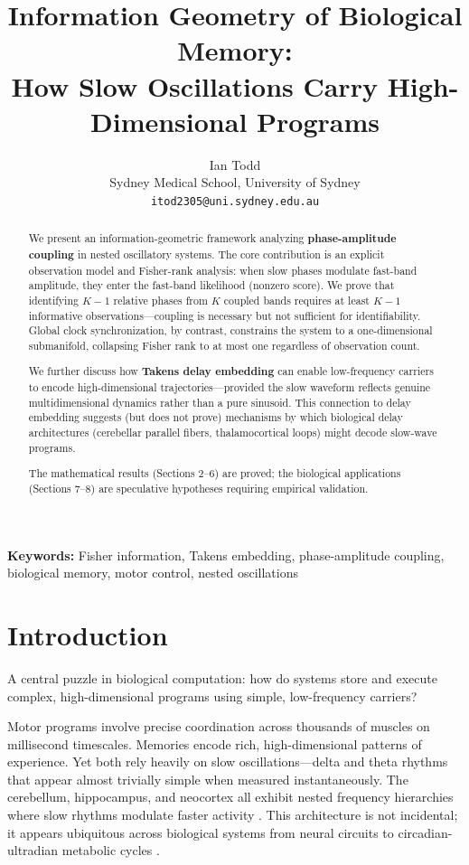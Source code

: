 \documentclass[12pt]{article}
\title{Information Geometry of Biological Memory: \\
How Slow Oscillations Carry High-Dimensional Programs}
\author{Ian Todd\\
Sydney Medical School, University of Sydney\\
\texttt{itod2305@uni.sydney.edu.au}}
\date{}
\begin{document}
\maketitle

\begin{abstract}
We present an information-geometric framework analyzing \textbf{phase-amplitude coupling} in nested oscillatory systems. The core contribution is an explicit observation model and Fisher-rank analysis: when slow phases modulate fast-band amplitude, they enter the fast-band likelihood (nonzero score). We prove that identifying $K-1$ relative phases from $K$ coupled bands requires at least $K-1$ informative observations---coupling is necessary but not sufficient for identifiability. Global clock synchronization, by contrast, constrains the system to a one-dimensional submanifold, collapsing Fisher rank to at most one regardless of observation count.

We further discuss how \textbf{Takens delay embedding} can enable low-frequency carriers to encode high-dimensional trajectories---provided the slow waveform reflects genuine multidimensional dynamics rather than a pure sinusoid. This connection to delay embedding suggests (but does not prove) mechanisms by which biological delay architectures (cerebellar parallel fibers, thalamocortical loops) might decode slow-wave programs.

The mathematical results (Sections 2--6) are proved; the biological applications (Sections 7--8) are speculative hypotheses requiring empirical validation.
\end{abstract}

\noindent\textbf{Keywords:} Fisher information, Takens embedding, phase-amplitude coupling, biological memory, motor control, nested oscillations

\section{Introduction}

A central puzzle in biological computation: how do systems store and execute complex, high-dimensional programs using simple, low-frequency carriers?

Motor programs involve precise coordination across thousands of muscles on millisecond timescales. Memories encode rich, high-dimensional patterns of experience. Yet both rely heavily on slow oscillations---delta and theta rhythms that appear almost trivially simple when measured instantaneously. The cerebellum, hippocampus, and neocortex all exhibit nested frequency hierarchies where slow rhythms modulate faster activity \citep{buzsaki2006rhythms}. This architecture is not incidental; it appears ubiquitous across biological systems from neural circuits to circadian-ultradian metabolic cycles \citep{lloyd2006ultradian,helm2017annual}.
\end{document}
